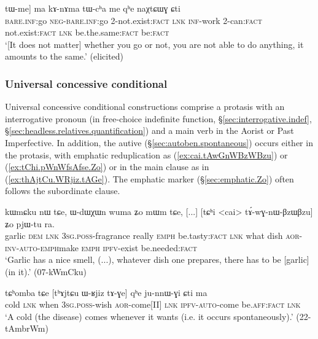 \begin{exe}
\ex  \label{ex:Ce.mACe.tWme}
\gll [[ɕe] [mɤ-ɕe] tɯ-me] ma kɤ-nɤma tɯ-cʰa me qʰe naχtɕɯɣ ɕti\\
\textsc{bare}.\textsc{inf}:go \textsc{neg}-\textsc{bare}.\textsc{inf}:go 2-not.exist:\textsc{fact} \textsc{lnk} \textsc{inf}-work 2-can:\textsc{fact} not.exist:\textsc{fact} \textsc{lnk} be.the.same:\textsc{fact} be:\textsc{fact} \\
\glt `[It does not matter] whether you go or not, you are not able to do anything, it amounts to the same.' (elicited)
\end{exe}

\subsubsection{Universal concessive conditional} \label{sec:universal.concessive.conditional}
Universal concessive conditional constructions comprise a protasis with an interrogative pronoun (in free-choice indefinite function, §\ref{sec:interrogative.indef}, §\ref{sec:headless.relatives.quantification}) and a main verb in the Aorist or Past Imperfective. In addition, the autive (§\ref{sec:autoben.spontaneous}) occurs either in the protasis, with emphatic reduplication as (\ref{ex:cai.tAwGnWBzWBzu}) or (\ref{ex:tChi.pWnWfsAfse.Zo}) or in the main clause as in (\ref{ex:thAjtCu.WRjiz.tAGe}). The emphatic marker  (§\ref{sec:emphatic.Zo}) often follows the subordinate clause.


\begin{exe}
\ex \label{ex:cai.tAwGnWBzWBzu}
\gll kɯmɕku nɯ tɕe, ɯ-dɯχɯn wuma ʑo mɯm tɕe, [...]  [tɕʰi <cai> tɤ́-wɣ-nɯ-βzɯ\redp{}βzu] ʑo pjɯ-tu ra. \\
garlic \textsc{dem} \textsc{lnk} \textsc{3sg}.\textsc{poss}-fragrance really \textsc{emph} be.tasty:\textsc{fact} \textsc{lnk} { } what dish \textsc{aor}-\textsc{inv}-\textsc{auto}-\textsc{emph}\redp{}make \textsc{emph} \textsc{ipfv}-exist  be.needed:\textsc{fact} \\
\glt `Garlic has a nice smell, (...), whatever dish one prepares, there has to be [garlic] (in it).' (07-kWmCku)
\end{exe}

 \begin{exe}
\ex \label{ex:thAjtCu.WRjiz.tAGe}
\gll  tɕʰomba tɕe [tʰɤjtɕu ɯ-ʁjiz tɤ-ɣe] qʰe ju-nnɯ-ɣi ɕti ma \\
cold \textsc{lnk} when \textsc{3sg}.\textsc{poss}-wish \textsc{aor}-come[II] \textsc{lnk} \textsc{ipfv}-\textsc{auto}-come be.\textsc{aff}:\textsc{fact} \textsc{lnk} \\
\glt `A cold (the disease) comes whenever it wants (i.e. it occurs spontaneously).' (22-tAmbrWm)
\end{exe}


